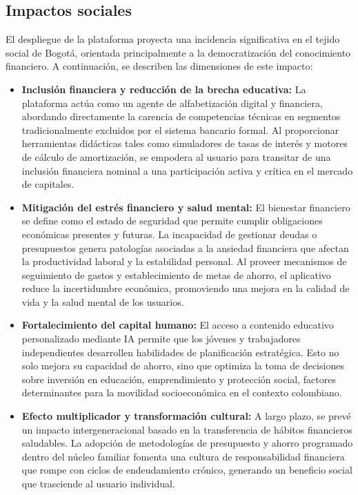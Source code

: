 \subsection*{Impactos sociales}

El despliegue de la plataforma proyecta una incidencia significativa en el tejido social de Bogotá, orientada principalmente a la democratización del conocimiento financiero. A continuación, se describen las dimensiones de este impacto:

\begin{itemize}
	\item \textbf{Inclusión financiera y reducción de la brecha educativa:} La plataforma actúa como un agente de alfabetización digital y financiera, abordando directamente la carencia de competencias técnicas en segmentos tradicionalmente excluidos por el sistema bancario formal. Al proporcionar herramientas didácticas tales como simuladores de tasas de interés y motores de cálculo de amortización, se empodera al usuario para transitar de una inclusión financiera nominal a una participación activa y crítica en el mercado de capitales.
	
	\item \textbf{Mitigación del estrés financiero y salud mental:} El bienestar financiero se define como el estado de seguridad que permite cumplir obligaciones económicas presentes y futuras. La incapacidad de gestionar deudas o presupuestos genera patologías asociadas a la ansiedad financiera que afectan la productividad laboral y la estabilidad personal. Al proveer mecanismos de seguimiento de gastos y establecimiento de metas de ahorro, el aplicativo reduce la incertidumbre económica, promoviendo una mejora en la calidad de vida y la salud mental de los usuarios.
	
	\item \textbf{Fortalecimiento del capital humano:} El acceso a contenido educativo personalizado mediante IA permite que los jóvenes y trabajadores independientes desarrollen habilidades de planificación estratégica. Esto no solo mejora su capacidad de ahorro, sino que optimiza la toma de decisiones sobre inversión en educación, emprendimiento y protección social, factores determinantes para la movilidad socioeconómica en el contexto colombiano.
	
	\item \textbf{Efecto multiplicador y transformación cultural:} A largo plazo, se prevé un impacto intergeneracional basado en la transferencia de hábitos financieros saludables. La adopción de metodologías de presupuesto y ahorro programado dentro del núcleo familiar fomenta una cultura de responsabilidad financiera que rompe con ciclos de endeudamiento crónico, generando un beneficio social que trasciende al usuario individual.
\end{itemize}